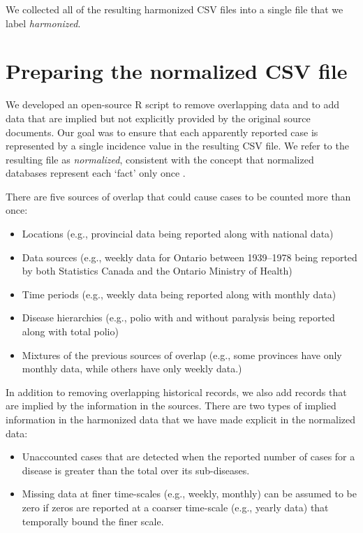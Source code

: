 \documentclass[12pt]{article}
\begin{document}
We collected all of the resulting harmonized CSV files into a single file that we label \emph{harmonized}.

\clearpage

\section{Preparing the normalized CSV file}\label{sec:appendix-normalized}

We developed an open-source R script to remove overlapping data and to add data that are implied but not explicitly provided by the original source documents. Our goal was to ensure that each apparently reported case is represented by a single incidence value in the resulting CSV file. We refer to the resulting file as \emph{normalized}, consistent with the concept that normalized databases represent each `fact' only once \cite{tidydata}.

There are five sources of overlap that could cause cases to be counted more than once:
\begin{itemize}
  \item Locations (e.g., provincial data being reported along with national data)
  \item Data sources (e.g., weekly data for Ontario between 1939--1978 being reported by both Statistics Canada and the Ontario Ministry of Health)
  \item Time periods (e.g., weekly data being reported along with monthly data)
  \item Disease hierarchies (e.g., polio with and without paralysis being reported along with total polio)
  \item Mixtures of the previous sources of overlap (e.g., some provinces have only monthly data, while others have only weekly data.)
\end{itemize}

In addition to removing overlapping historical records, we also add records that are implied by the information in the sources. There are two types of implied information in the harmonized data that we have made explicit in the normalized data:
\begin{itemize}
  \item Unaccounted cases that are detected when the reported number of cases for a disease is greater than the total over its sub-diseases.
  \item Missing data at finer time-scales (e.g., weekly, monthly) can be assumed to be zero if zeros are reported at a coarser time-scale (e.g., yearly data) that temporally bound the finer scale.
\end{itemize}
\end{document}
